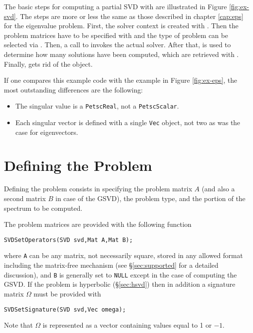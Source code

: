 The basic steps for computing a partial SVD with \slepc are illustrated in Figure \ref{fig:ex-svd}. The steps are more or less the same as those described in chapter \ref{cap:eps} for the eigenvalue problem. First, the solver context is created with . Then the problem matrices have to be specified with  and the type of problem can be selected via . Then, a call to  invokes the actual solver. After that,  is used to determine how many solutions have been computed, which are retrieved with . Finally,  gets rid of the object.

If one compares this example code with the  example in Figure \ref{fig:ex-eps}, the most outstanding differences are the following:
\begin{itemize}
\item The singular value is a \texttt{PetscReal}, not a \texttt{PetscScalar}.
\item Each singular vector is defined with a single \texttt{Vec} object, not two as was the case for eigenvectors.
\end{itemize}

\section{Defining the Problem}

Defining the problem consists in specifying the problem matrix $A$ (and also a second matrix $B$ in case of the GSVD), the problem type, and the portion of the spectrum to be computed.

The problem matrices are provided with the following function
        \begin{Verbatim}[fontsize=\small]
        SVDSetOperators(SVD svd,Mat A,Mat B);
        \end{Verbatim}
where \texttt{A} can be any matrix, not necessarily square, stored in any allowed \petsc format including the matrix-free mechanism (see \S\ref{sec:supported} for a detailed discussion), and \texttt{B} is generally set to \texttt{NULL} except in the case of computing the GSVD.
If the problem is hyperbolic (\S\ref{sec:hsvd}) then in addition a signature matrix $\Omega$ must be provided with
        \begin{Verbatim}[fontsize=\small]
        SVDSetSignature(SVD svd,Vec omega);
        \end{Verbatim}
Note that $\Omega$ is represented as a vector containing values equal to 1 or $-1$.

